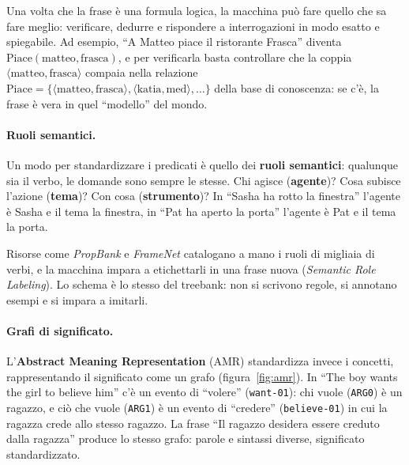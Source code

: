 Una volta che la frase è una formula logica, la macchina può fare quello che sa fare meglio: verificare, dedurre e rispondere a interrogazioni in modo esatto e spiegabile. Ad esempio, \enquote{A Matteo piace il ristorante Frasca} diventa $\text{Piace}(\text{matteo}, \text{frasca})$, e per verificarla basta controllare che la coppia $\langle \text{matteo}, \text{frasca} \rangle$ compaia nella relazione $\text{Piace} = \{\langle \text{matteo}, \text{frasca} \rangle, \langle \text{katia}, \text{med} \rangle, \dots\}$ della base di conoscenza: se c'è, la frase è vera in quel \enquote{modello} del mondo.

\paragraph{Ruoli semantici.} Un modo per standardizzare i predicati è quello dei \textbf{ruoli semantici}: qualunque sia il verbo, le domande sono sempre le stesse. Chi agisce (\textbf{agente})? Cosa subisce l'azione (\textbf{tema})? Con cosa (\textbf{strumento})? In \enquote{Sasha ha rotto la finestra} l'agente è Sasha e il tema la finestra, in \enquote{Pat ha aperto la porta} l'agente è Pat e il tema la porta.

Risorse come \textit{PropBank} e \textit{FrameNet} catalogano a mano i ruoli di migliaia di verbi, e la macchina impara a etichettarli in una frase nuova (\textit{Semantic Role Labeling}). Lo schema è lo stesso del treebank: non si scrivono regole, si annotano esempi e si impara a imitarli.

\paragraph{Grafi di significato.} L'\textbf{Abstract Meaning Representation} (AMR) \cite{banarescu2013amr} standardizza invece i concetti, rappresentando il significato come un grafo (figura~\ref{fig:amr}). In \enquote{The boy wants the girl to believe him} c'è un evento di \enquote{volere} (\texttt{want-01}): chi vuole (\texttt{ARG0}) è un ragazzo, e ciò che vuole (\texttt{ARG1}) è un evento di \enquote{credere} (\texttt{believe-01}) in cui la ragazza crede allo stesso ragazzo. La frase \enquote{Il ragazzo desidera essere creduto dalla ragazza} produce lo stesso grafo: parole e sintassi diverse, significato standardizzato.

